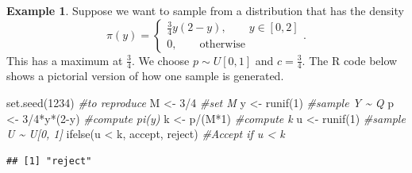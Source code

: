 \documentclass[
]{book}
\newenvironment{Shaded}{\begin{snugshade}}{\end{snugshade}}
\newcommand{\CommentTok}[1]{\textcolor[rgb]{0.56,0.35,0.01}{\textit{#1}}}
\newcommand{\DecValTok}[1]{\textcolor[rgb]{0.00,0.00,0.81}{#1}}
\newcommand{\FunctionTok}[1]{\textcolor[rgb]{0.00,0.00,0.00}{#1}}
\newcommand{\NormalTok}[1]{#1}
\newcommand{\OtherTok}[1]{\textcolor[rgb]{0.56,0.35,0.01}{#1}}
\newcommand{\SpecialCharTok}[1]{\textcolor[rgb]{0.00,0.00,0.00}{#1}}
\newcommand{\StringTok}[1]{\textcolor[rgb]{0.31,0.60,0.02}{#1}}
\theoremstyle{definition}
\theoremstyle{definition}
\newtheorem{example}{Example}[chapter]
\theoremstyle{definition}
\theoremstyle{definition}
\theoremstyle{remark}
\begin{document}
\begin{example}
Suppose we want to sample from a distribution that has the density
\[
\pi(y) = \begin{cases}
\frac{3}{4}y(2-y), \qquad y \in [0, 2] \\
0, \qquad \textrm{otherwise}
\end{cases}.
\]
This has a maximum at \(\frac{3}{4}\). We choose \(p \sim U[0, 1]\) and \(c = \frac{3}{4}\). The R code below shows a pictorial version of how one sample is generated.

\begin{Shaded}
\begin{Highlighting}[]
\FunctionTok{set.seed}\NormalTok{(}\DecValTok{1234}\NormalTok{)   }\CommentTok{\#to reproduce}
\NormalTok{M }\OtherTok{\textless{}{-}} \DecValTok{3}\SpecialCharTok{/}\DecValTok{4}         \CommentTok{\#set M}
\NormalTok{y }\OtherTok{\textless{}{-}} \FunctionTok{runif}\NormalTok{(}\DecValTok{1}\NormalTok{)    }\CommentTok{\#sample Y \textasciitilde{} Q}
\NormalTok{p }\OtherTok{\textless{}{-}} \DecValTok{3}\SpecialCharTok{/}\DecValTok{4}\SpecialCharTok{*}\NormalTok{y}\SpecialCharTok{*}\NormalTok{(}\DecValTok{2}\SpecialCharTok{{-}}\NormalTok{y) }\CommentTok{\#compute pi(y)}
\NormalTok{k }\OtherTok{\textless{}{-}}\NormalTok{ p}\SpecialCharTok{/}\NormalTok{(M}\SpecialCharTok{*}\DecValTok{1}\NormalTok{)     }\CommentTok{\#compute k}
\NormalTok{u }\OtherTok{\textless{}{-}} \FunctionTok{runif}\NormalTok{(}\DecValTok{1}\NormalTok{)    }\CommentTok{\#sample U \textasciitilde{} U[0, 1]}
\FunctionTok{ifelse}\NormalTok{(u }\SpecialCharTok{\textless{}}\NormalTok{ k, }\StringTok{\textquotesingle{}accept\textquotesingle{}}\NormalTok{, }\StringTok{\textquotesingle{}reject\textquotesingle{}}\NormalTok{) }\CommentTok{\#Accept if  u \textless{} k}
\end{Highlighting}
\end{Shaded}

\begin{verbatim}
## [1] "reject"
\end{verbatim}


\end{example}
\end{document}

